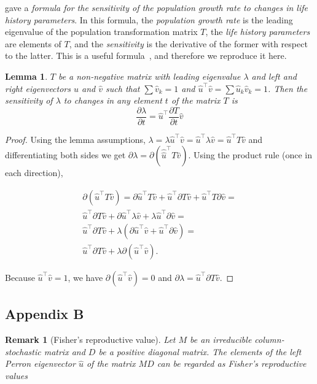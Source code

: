 \documentclass[9pt, a4paper, twocolumn]{extarticle}
\newcommand*{\tr}{^\intercal}
\newtheorem{lemma}{Lemma}
\newtheorem{remark}{Remark}
\begin{document}
\citet{Caswell1978} gave a \emph{formula for the sensitivity of the population growth rate to changes in life history parameters}.
In this formula, the \emph{population growth rate} is the leading eigenvalue of the population transformation matrix $T$, the \emph{life history parameters} are elements of $T$, and the \emph{sensitivity} is the derivative of the former with respect to the latter.
This is a useful formula~\citep[ch.~10]{Caswell1978,Hermisson2002,Ram2012,Otto2007}, and therefore we reproduce it here.

\begin{lemma}
$T$ be a non-negative matrix with leading eigenvalue $\lambda$ and left and right eigenvectors $\hat u$ and $\hat v$ such that $\sum{\hat v_k}=1$ and $\hat u\tr \hat v = \sum{\hat u_k \hat v_k} = 1$.
Then the sensitivity of $\lambda$ to changes in any element $t$ of the matrix $T$ is
\begin{equation}\label{eq:Caswells_formula}
\frac{\partial \lambda}{\partial t} = 
\hat u\tr \frac{\partial T}{\partial t} \hat v
\end{equation}
\end{lemma}

\begin{proof} 
Using the lemma assumptions,
$\lambda = \lambda \hat u\tr \hat v = \hat u\tr \lambda \hat v = \hat u\tr T \hat v$ and differentiating both sides we get $\partial \lambda = \partial (\hat \hat u\tr T \hat v)$.
Using the product rule (once in each direction),

\begin{multline}
\partial (\hat u\tr T \hat v) = 
\partial \hat u\tr T \hat v + \hat u\tr \partial T \hat v + \hat u\tr T \partial \hat v = \\
\hat u\tr \partial T \hat v + \partial \hat u\tr \lambda \hat v  + \lambda \hat u\tr \partial \hat v = \\
\hat u\tr \partial T \hat v + \lambda(\partial \hat u\tr \hat v  + \hat u\tr \partial \hat v) = \\
\hat u\tr \partial T \hat v + \lambda \partial(\hat u\tr \hat v).
\end{multline}

Because $\hat u\tr \hat v = 1$,
we have $\partial (\hat u\tr \hat v) = 0$ and
$\partial \lambda = \hat u\tr \partial T \hat v$.
\end{proof}

\subsection*{Appendix B}\label{sec:AppB}
\begin{remark}[Fisher's reproductive value]
Let $M$ be an irreducible column-stochastic matrix and $D$ be a positive diagonal matrix. 
The elements of the left \emph{Perron} eigenvector $\hat u$ of the matrix $MD$ can be regarded as \emph{Fisher's reproductive values}~\citep[pg.~27]{Fisher1930}
\end{remark}
\end{document}
